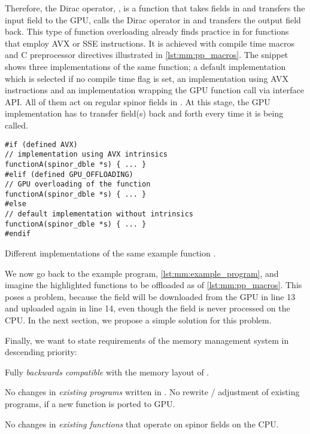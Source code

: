 Therefore, the Dirac operator, , is a function that takes fields in \openqxd and transfers the input field to the GPU, calls the Dirac operator in \quda and transfers the output field back.
This type of function overloading already finds practice in \openqxd for functions that employ AVX or SSE instructions.
It is achieved with compile time macros and C preprocessor directives illustrated in \cref{lst:mm:pp_macros}.
The snippet shows three implementations of the same function; a default implementation which is selected if no compile time flag is set, an implementation using AVX instructions and an implementation wrapping the GPU function call via \qudas interface API.
All of them act on regular spinor fields in \openqxd.
At this stage, the GPU implementation has to transfer field(s) back and forth every time it is being called.

\begin{codelisting}
\begin{verbatim}
#if (defined AVX)
// implementation using AVX intrinsics
functionA(spinor_dble *s) { ... }
#elif (defined GPU_OFFLOADING)
// GPU overloading of the function
functionA(spinor_dble *s) { ... }
#else
// default implementation without intrinsics
functionA(spinor_dble *s) { ... }
#endif
\end{verbatim}
\caption{Different implementations of the same example function .}
\label{lst:mm:pp_macros}
\end{codelisting}

We now go back to the example program, \cref{lst:mm:example_program}, and imagine the highlighted functions to be offloaded as of \cref{lst:mm:pp_macros}.
This poses a problem, because the field  will be downloaded from the GPU in line 13 and uploaded again in line 14, even though the field is never processed on the CPU.
In the next section, we propose a simple solution for this problem.

Finally, we want to state requirements of the memory management system in descending priority:
\begin{requirements}
  \item \label{mm:req:R1} Fully \emph{backwards compatible} with the memory layout of \openqxd.
  \item \label{mm:req:R2} No changes in \emph{existing programs} written in \openqxd. No rewrite / adjustment of existing programs, if a new function is ported to GPU.
  \item \label{mm:req:R3} No changes in \emph{existing functions} that operate on spinor fields on the CPU.
\end{requirements}

